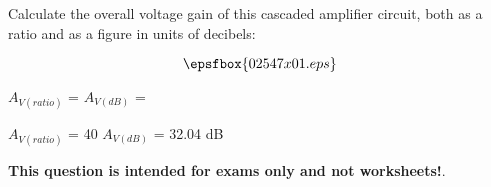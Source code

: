 

Calculate the overall voltage gain of this cascaded amplifier circuit, both as a ratio and as a figure in units of decibels:

$$\epsfbox{02547x01.eps}$$

$A_{V(ratio)}$ =  \hskip 80pt $A_{V(dB)}$ = 







$A_{V(ratio)}$ = 40 \hskip 50pt $A_{V(dB)}$ = 32.04 dB







{\bf This question is intended for exams only and not worksheets!}.




